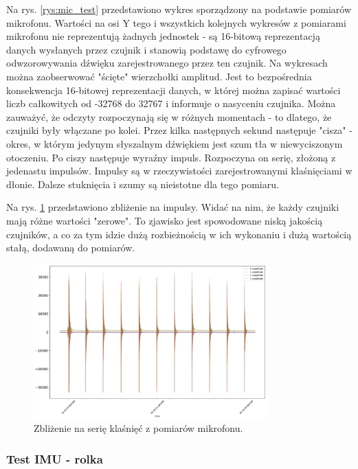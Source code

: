 \documentclass[12pt,oneside,a4paper]{book}
\theoremstyle{break}
\begin{document}
Na rys. \ref*{rys:mic_test} przedstawiono wykres sporządzony na 
podstawie pomiarów mikrofonu.
Wartości na osi Y tego i wszystkich kolejnych wykresów z pomiarami mikrofonu
nie reprezentują
żadnych jednostek - są 16-bitową reprezentacją danych wysłanych przez czujnik
i stanowią podstawę do cyfrowego odwzorowywania dźwięku zarejestrowanego
przez ten czujnik. Na wykresach można zaobserwować "ścięte" wierzchołki
amplitud. Jest to bezpośrednia konsekwencja 16-bitowej reprezentacji danych, 
w której można zapisać wartości liczb całkowitych od -32768 do 32767
i informuje o nasyceniu czujnika.
Można zauważyć, że odczyty rozpoczynają się w różnych momentach - 
to dlatego, że czujniki były włączane po kolei. Przez kilka następnych
sekund następuje "cisza" - okres, w którym jedynym słyszalnym dźwiękiem 
jest szum tła w niewyciszonym otoczeniu. Po ciszy następuje 
wyraźny impuls. Rozpoczyna on serię, 
złożoną z jedenastu impulsów. Impulsy są w rzeczywistości 
zarejestrowanymi klaśnięciami w dłonie.
Dalsze stuknięcia i szumy są nieistotne dla tego pomiaru.
\par Na rys. \ref*{rys:impulse_series_closeup}
przedstawiono zbliżenie na impulsy. Widać na nim, że każdy czujniki
mają różne wartości "zerowe". To zjawisko jest spowodowane 
niską jakością czujników, 
a co za tym idzie dużą rozbieżnością w ich wykonaniu 
i dużą wartością stałą, 
dodawaną do pomiarów.
 
\begin{figure}[H]
    \begin{center}
        \includegraphics[width=0.8\textwidth]{impulse_series_closeup.png}
        \caption{Zbliżenie na serię klaśnięć z pomiarów mikrofonu.}
        \label{rys:impulse_series_closeup}
    \end{center}
\end{figure}

\subsubsection{Test IMU - rolka}
\end{document}
